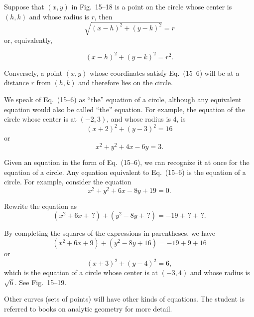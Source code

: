 \documentclass[11pt]{book}
\theoremstyle{bkplain}
\theoremstyle{XIplainnote}
\theoremstyle{bkplain}
\theoremstyle{bkplain}
\begin{document}
\FIGXVEIGHTEENNINETEEN

Suppose that $(x, y)$ in Fig.~15--18 is a point on the circle whose center is
$(h, k)$ and whose radius is $r$, then
\[
\sqrt{(x-h)^2 + (y-k)^2} = r
\]
or, equivalently,

\begin{equation}\tag{15--6}
(x-h)^2 + (y-k)^2 = r^2.
\end{equation}

Conversely, a point $(x, y)$ whose coordinates satisfy Eq.~(15--6) will be at
a distance $r$ from $(h, k)$ and therefore lies on the circle.

We speak of Eq.~(15--6) as ``the'' equation of a circle, although any
equivalent equation would also be called ``the'' equation. For example, the
equation of the circle whose center is at $(-2, 3)$, and whose radius is 4, is
\[
(x + 2)^2 + (y - 3)^2 = 16
\]
or
\[
x^2 + y^2 + 4x - 6y = 3.
\]

Given an equation in the form of Eq.~(15--6), we can recognize it at once for
the equation of a circle. Any equation equivalent to Eq.~(15--6) is the
equation of a circle. For example, consider the equation
\[
x^2 + y^2 + 6x - 8y + 19 = 0.
\]

Rewrite the equation as
\[
(x^2 + 6x + \,?) + (y^2 - 8y + \,?) = -19 + \,? + \,?.
\]

By completing the squares of the expressions in parentheses, we have
\[
(x^2 + 6x + 9) + (y^2 - 8y + 16) = -19 + 9 + 16
\]
or
\[
(x + 3)^2 + (y - 4)^2 = 6,
\]
which is the equation of a circle whose center is at $(-3, 4)$ and whose
radius is $\sqrt{6}$. See Fig.~15--19.

Other curves (sets of points) will have other kinds of equations. The student
is referred to books on analytic geometry for more detail.
\end{document}
